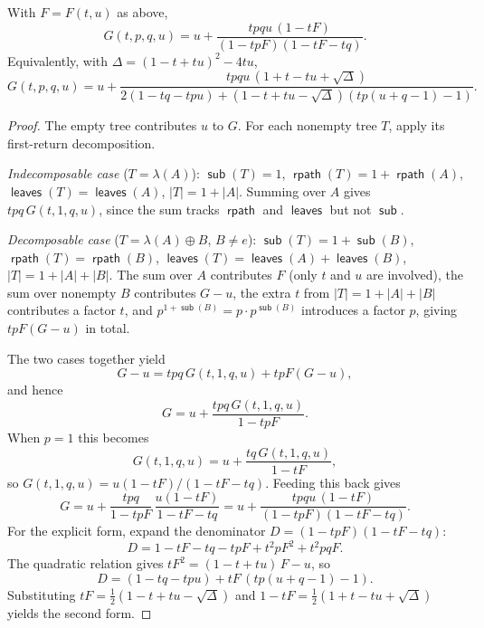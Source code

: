 \documentclass[10pt,a4paper]{amsart}
\DeclareMathOperator{\leaves}{\mathsf{leaves}}
\DeclareMathOperator{\rpath}{\mathsf{rpath}}
\DeclareMathOperator{\subtrees}{\mathsf{sub}}
\begin{document}
\begin{theorem}\label{thm:genfun}
With $F = F(t,u)$ as above,
\[
  G(t,p,q,u) = u +
    \frac{tpqu\,(1-tF)}{(1-tpF)(1-tF-tq)}.
\]
Equivalently, with
$\Delta = (1-t+tu)^2 - 4tu$,
\[
  G(t,p,q,u) = u +
    \frac{tpqu\,(1+t-tu+\sqrt{\Delta})}
    {2(1-tq-tpu)
      + (1-t+tu-\sqrt{\Delta})(tp(u+q-1)-1)}.
\]
\end{theorem}

\begin{proof}
The empty tree contributes $u$ to $G$. For each
nonempty tree $T$, apply its first-return decomposition.

\emph{Indecomposable case} ($T = \lambda(A)$):
$\subtrees(T) = 1$,
$\rpath(T) = 1 + \rpath(A)$,
$\leaves(T) = \leaves(A)$, $|T| = 1 + |A|$.
Summing over $A$ gives $tpq\, G(t,1,q,u)$, since the
sum tracks $\rpath$ and $\leaves$ but not $\subtrees$.

\emph{Decomposable case}
($T = \lambda(A) \oplus B$, $B \neq e$):
$\subtrees(T) = 1 + \subtrees(B)$,
$\rpath(T) = \rpath(B)$,
$\leaves(T) = \leaves(A) + \leaves(B)$,
$|T| = 1 + |A| + |B|$.
The sum over $A$ contributes $F$ (only $t$ and $u$
are involved), the sum over nonempty $B$ contributes
$G - u$, the extra $t$ from $|T| = 1 + |A| + |B|$
contributes a factor $t$, and
$p^{1 + \subtrees(B)} = p \cdot p^{\subtrees(B)}$
introduces a factor $p$, giving $tpF(G - u)$ in total.

The two cases together yield
\[
  G - u = tpq\, G(t,1,q,u) + tpF(G - u),
\]
and hence
\[
  G = u + \frac{tpq\, G(t,1,q,u)}{1 - tpF}.
\]
When $p = 1$ this becomes
\[
  G(t,1,q,u) = u +
    \frac{tq\, G(t,1,q,u)}{1 - tF},
\]
so $G(t,1,q,u) = u(1 - tF)/(1 - tF - tq)$.
Feeding this back gives
\[
  G
  =  u + \frac{tpq}{1 - tpF}\,
    \frac{u(1 - tF)}{1 - tF - tq}
  = u + \frac{tpqu\,(1 - tF)}
    {(1 - tpF)(1 - tF - tq)}.
\]
For the explicit form, expand the denominator
$D = (1 - tpF)(1 - tF - tq)$:
\[
  D = 1 - tF - tq - tpF + t^2 pF^2 + t^2 pqF.
\]
The quadratic relation gives
$tF^2 = (1 - t + tu)\,F - u$, so
\[
  D = (1 - tq - tpu) + tF\,(tp(u + q - 1) - 1).
\]
Substituting
$tF = \tfrac{1}{2}(1 - t + tu - \sqrt{\Delta})$ and
$1 - tF = \tfrac{1}{2}(1 + t - tu + \sqrt{\Delta})$
yields the second form.
\end{proof}
\end{document}
